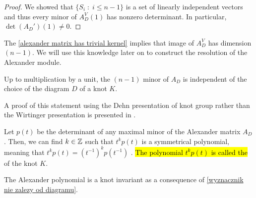\begin{proof}
  We showed that $\{S_i\;:\;i\leq n-1\}$ is a set of linearly independent vectors and thus every minor of $A_D^V(1)$ has nonzero determinant. In particular, $\det(A_D')(1)\neq 0$.
\end{proof}

The \cref{alexander matrix has trivial kernel} implies that image of $A_D^V$ has dimension $(n-1)$. We will use this knowledge later on to construct the resolution of the Alexander module.

\begin{theorem}\label{wyznacznik nie zalezy od diagramu}
  Up to multiplication by a unit, the $(n-1)$ minor of $A_D$ is independent of the choice of the diagram $D$ of a knot $K$.
\end{theorem}

A proof of this statement using the Dehn presentation of knot group rather than the Wirtinger presentation is presented in \cite{alex-oryginal}.

\begin{definition}
  Let $p(t)$ be the determinant of any maximal minor of the Alexander matrix $A_D$. Then, we can find $k\in\operatorname{\mathbb{Z}}$ such that $t^kp(t)$ is a symmetrical polynomial, meaning that $t^kp(t)=(t^{-1})^kp(t^{-1})$ \cite{alex-oryginal}.
  \hl{The polynomial $t^kp(t)$ is called the } of the knot $K$.
\end{definition}

The Alexander polynomial is a knot invariant as a consequence of \cref{wyznacznik nie zalezy od diagramu}.


